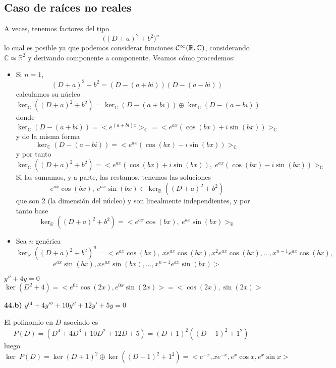 \subsection{Caso de raíces no reales}
A veces, tenemos factores del tipo
$$\big((D+a)^2+b^2\big)^n$$
lo cual es posible ya que podemos considerar funciones $\mathcal{C}^{\infty}(\mathbb R, \mathbb C)$, considerando $\mathbb C \simeq \mathbb R^2$ y derivando componente a componente. Veamos cómo procedemos:
\begin{itemize}
    \item Si $n=1$,
$$(D+a)^2+b^2=(D-(a+bi))(D-(a-bi))$$
calculamos su núcleo
$$\ker_{\mathbb C}((D+a)^2+b^2)=\ker_{\mathbb C} (D-(a+bi)) \oplus\ker_{\mathbb C} (D-(a-bi)) $$
donde
$$\ker_{\mathbb C} (D-(a+bi))=<e^{(a+bi)x}>_{\mathbb C}=<e^{ax}(\cos (bx) + i\sin (bx))>_{\mathbb C}$$
y de la misma forma
$$\ker_{\mathbb C} (D-(a-bi))=<e^{ax}(\cos (bx) - i\sin (bx))>_{\mathbb C}$$
y por tanto
$$\ker_{\mathbb C}((D+a)^2+b^2)=<e^{ax}(\cos (bx) + i\sin (bx)), \; e^{ax}(\cos (bx) - i\sin (bx))>_{\mathbb C}$$
Si las sumamos, y a parte, las restamos, tenemos las soluciones
$$e^{ax}\cos(bx), \: e^{ax} \sin(bx) \in \ker_{\mathbb R}((D+a)^2+b^2)$$
que son 2 (la dimensión del núcleo) y son linealmente independientes, y por tanto base 
$$\ker_{\mathbb R}((D+a)^2+b^2)=<e^{ax}\cos(bx), \: e^{ax} \sin(bx)>_{\mathbb R}$$
\item Sea $n$ genérica
$$\ker_{\mathbb R}((D+a)^2+b^2)^n=<e^{ax}\cos(bx), \: xe^{ax}\cos(bx), x^2 e^{ax}\cos(bx), \ldots, x^{n-1}e^{ax}\cos(bx), $$$$e^{ax} \sin(bx), xe^{ax} \sin(bx) , \ldots , x^{n-1} e^{ax} \sin(bx)>$$
\end{itemize}
\begin{eje}
    $y''+4y=0$
    $$\ker(D^2+4)=<e^{0x}\cos(2x),e^{0x}\sin(2x)>=<\cos(2x),\sin(2x)>$$
\end{eje}
\begin{ejer}
    \textbf{44.b)} $y^{(4}+4y'''+10y''+12y'+5y=0$
\end{ejer}
\begin{sol}
    El polinomio en $D$ asociado es 
    $$P(D)=(D^4+4D^3+10D^2+12D+5)=(D+1)^2((D-1)^2+1^2)$$
    luego 
    $$\ker \: P(D)=\ker (D+1)^2 \oplus \ker((D-1)^2+1^2)=<e^{-x}, xe^{-x}, e^{x}\cos x, e^{x}\sin x>$$
\end{sol}
